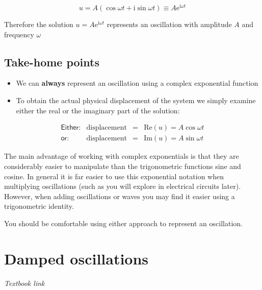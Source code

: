 \documentclass[
]{book}
\providecommand{\tightlist}{%
  \setlength{\itemsep}{0pt}\setlength{\parskip}{0pt}}
\begin{document}
\begin{equation}
u = A (\cos \omega t + \mathrm{i} \sin \omega t) \equiv A \mathrm{e}^{\mathrm{i}\omega t}
\label{eq:ch3-demoivreoscillation1}
\end{equation}

Therefore the solution \(u = A\mathrm{e}^{\mathrm{i}\omega t}\) represents an oscillation with amplitude \(A\) and frequency \(\omega\)

\hypertarget{take-home-points}{%
\section{Take-home points}\label{take-home-points}}

\begin{itemize}
\tightlist
\item
  We can \textbf{always} represent an oscillation using a complex exponential function
\item
  To obtain the actual physical displacement of the system we simply examine either the real or the imaginary part of the solution:
\end{itemize}

\begin{equation}
\begin{array}{lrcl}
\textsf{Either:} & \textrm{displacement} &=& \mathrm{Re}(u) = A \cos \omega t \\
\textsf{or:} & \textrm{displacement} &=& \mathrm{Im}(u) = A \sin \omega t
\end{array}
\end{equation}

The main advantage of working with complex exponentials is that they are considerably easier to manipulate than the trigonometric functions sine and cosine. In general it is far easier to use this exponential notation when multiplying oscillations (such as you will explore in electrical circuits later). However, when adding oscillations or waves you may find it easier using a trigonometric identity.

You should be comfortable using either approach to represent an oscillation.

\hypertarget{sec:ch4-dampedoscillations}{%
\chapter{Damped oscillations}\label{sec:ch4-dampedoscillations}}

\emph{Textbook link}
\end{document}
